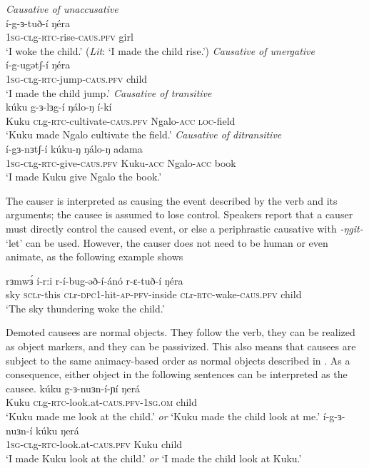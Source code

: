 \ea \textit{Causative of unaccusative}\\
	\gll   í-g-ɜ-tuð-í ŋéra \\
		\textsc{1sg-cl}g-\textsc{rtc}-rise-\textsc{caus.pfv} girl\\
	\glt 	 `I woke the child.' (\textit{Lit}: `I made the child rise.')
\ex  \textit{Causative of unergative}\\
 	\gll í-g-ugətʃ-í  ŋéra \\
 		\textsc{1sg-cl}g-\textsc{rtc}-jump-\textsc{caus.pfv} child\\
	\glt  `I made the child jump.'
\ex  \textit{Causative of transitive}\\
 	\gll kúku g-ɜ-lɜg-í ŋálo-ŋ í-kí			 \\
 	Kuku \textsc{cl}g-\textsc{rtc}-cultivate-\textsc{caus.pfv} Ngalo-\textsc{acc} \textsc{loc}-field \\
 	\glt  `Kuku made Ngalo cultivate the field.'
\ex  \textit{Causative of ditransitive}\\
 	\gll í-gɜ-nɜtʃ-í kúku-ŋ ŋálo-ŋ adama			 \\
 	\textsc{1sg-cl}g-\textsc{rtc}-give-\textsc{caus.pfv} Kuku-\textsc{acc} Ngalo-\textsc{acc} book \\
 	\glt  `I made Kuku give Ngalo the book.'
 \z 
 
The causer is interpreted as causing the event described by the verb and its arguments; the causee is assumed to lose control. Speakers report that a causer must directly control the caused event, or else a periphrastic causative with \textit{-ŋgit-} `let' can be used. However, the causer does not need to be human or even animate, as the following example shows %

\ea \gll rɜmwɜ́  í-r:i r-í-bug-əð-í-ánó r-ɛ-tuð-í ŋéra \\
sky \textsc{scl}r-this  \textsc{cl}r-\textsc{dpc1}-hit-\textsc{ap}-\textsc{pfv}-inside \textsc{cl}r-\textsc{rtc}-wake-\textsc{caus.pfv} child\\
\glt `The sky thundering woke the child.' 
\z 

Demoted causees are normal objects. They follow the verb, they can be realized as object markers, and they can be passivized. This also means that causees are subject to the same animacy-based order as normal objects described in . As a consequence, either object in the following sentences can be interpreted as the causee.
\ea \gll kúku g-ɜ-nuɜn-í-ɲí ŋerá \\
 Kuku \textsc{cl}g-\textsc{rtc}-look.at-\textsc{caus.pfv-}\textsc{1sg.om} child\\
\glt `Kuku made me look at the child.' 
\textit{or} `Kuku made the child look at me.' \label{ex:ch12:causamb1}
\ex \gll í-g-ɜ-nuɜn-í kúku ŋerá\\
 \textsc{1sg-cl}g-\textsc{rtc}-look.at-\textsc{caus.pfv} Kuku child\\
\glt `I made Kuku look at the child.' \textit{or}
`I made the child look at Kuku.' \label{ex:ch12:causamb2}
\z

